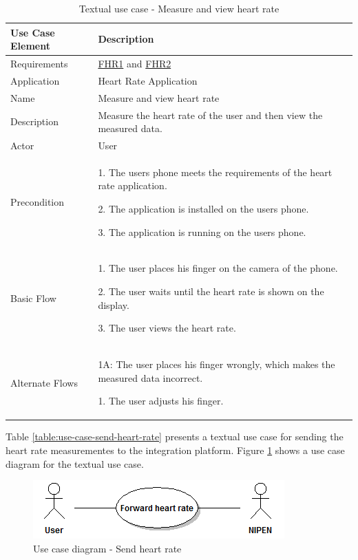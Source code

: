 \begin{table}[H]
\begin{center}
\begin{tabular}{ l | p{10cm} }
  \hline
  \textbf{Use Case Element} & \textbf{Description} \\ \hline\hline
  Requirements & \hyperref[table:reqheartrate]{FHR1} and \hyperref[table:reqheartrate]{FHR2} \\ \hline
  Application & Heart Rate Application \\ \hline
  Name & Measure and view heart rate \\ \hline
  Description & Measure the heart rate of the user and then view the measured data. \\ \hline
  Actor & User \\ \hline
  Precondition &
    \par 1. The users phone meets the requirements of the heart rate application.
  	\par 2. The application is installed on the users phone.
  	\par 3. The application is running on the users phone.
  \\ \hline
  Basic Flow & 
  	\par 1. The user places his finger on the camera of the phone.
  	\par 2. The user waits until the heart rate is shown on the display.
  	\par 3. The user views the heart rate.
  \\ \hline
  Alternate Flows & 
  	\par 1A: The user places his finger wrongly, which makes the measured data incorrect.
  	\par\hspace{15pt} 1. The user adjusts his finger.
  \\ \hline
\end{tabular}
\end{center}
\caption{Textual use case - Measure and view heart rate}
\label{table:use-case-measure-heart-rate}
\end{table}

Table \ref{table:use-case-send-heart-rate} presents a textual use case for sending the heart rate measurementes to
the integration platform. Figure \ref{figure:use-case-diagram-send-heart-rate} shows a use case diagram for the textual use case.

\begin{figure}[H]
\centering
\includegraphics[scale=0.75]{../Figures/use-case-diagram-send-heart-rate.png}
\caption{Use case diagram - Send heart rate}
\label{figure:use-case-diagram-send-heart-rate}
\end{figure}

